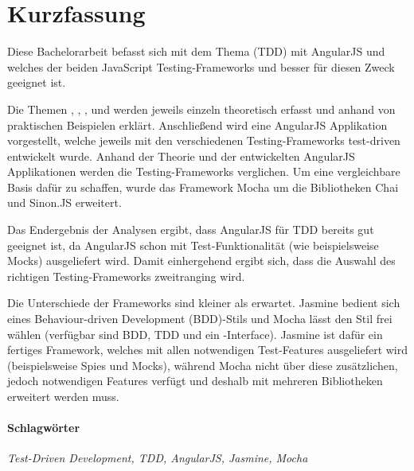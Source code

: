 \section*{Kurzfassung}
\vspace{0.5cm}

Diese Bachelorarbeit befasst sich mit dem Thema  (TDD) mit AngularJS und welches der beiden JavaScript Testing-Frameworks  und  besser für diesen Zweck geeignet ist.

Die Themen , , ,  und  werden jeweils einzeln theoretisch erfasst und anhand von praktischen Beispielen erklärt. Anschließend wird eine AngularJS Applikation vorgestellt, welche jeweils mit den verschiedenen Testing-Frameworks test-driven entwickelt wurde. Anhand der Theorie und der entwickelten AngularJS Applikationen werden die Testing-Frameworks verglichen. Um eine vergleichbare Basis dafür zu schaffen, wurde das Framework Mocha um die Bibliotheken Chai und Sinon.JS erweitert.

Das Endergebnis der Analysen ergibt, dass AngularJS für TDD bereits gut geeignet ist, da AngularJS schon mit Test-Funktionalität (wie beispielsweise Mocks) ausgeliefert wird. Damit einhergehend ergibt sich, dass die Auswahl des richtigen Testing-Frameworks zweitranging wird.

Die Unterschiede der Frameworks sind kleiner als erwartet. Jasmine bedient sich eines Behaviour-driven Development (BDD)-Stils und Mocha lässt den Stil frei wählen (verfügbar sind BDD, TDD und ein -Interface). Jasmine ist dafür ein fertiges Framework, welches mit allen notwendigen Test-Features ausgeliefert wird (beispielsweise Spies und Mocks), während Mocha nicht über diese zusätzlichen, jedoch notwendigen Features verfügt und deshalb mit mehreren Bibliotheken erweitert werden muss.

\paragraph{Schlagwörter}
\textit{Test-Driven Development, TDD, AngularJS, Jasmine, Mocha}

